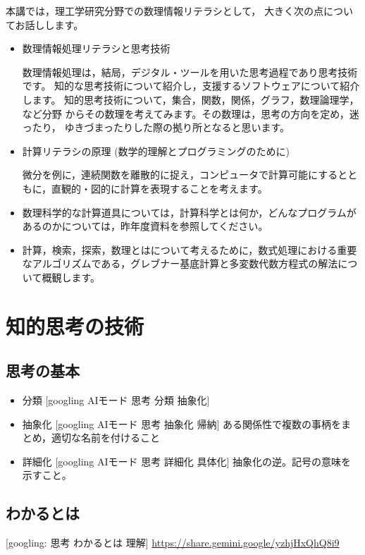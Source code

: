 \documentclass[dvipdfmx,11pat]{jarticle}
\begin{document}
本講では，理工学研究分野での数理情報リテラシとして，
大きく次の点についてお話しします。

\begin{itemize}
\item 数理情報処理リテラシと思考技術

数理情報処理は，結局，デジタル・ツールを用いた思考過程であり思考技術です。
知的な思考技術について紹介し，支援するソフトウェアについて紹介します。
知的思考技術について，集合，関数，関係，グラフ，数理論理学，など分野
からその数理を考えてみます。その数理は，思考の方向を定め，迷ったり，
ゆきづまったりした際の拠り所となると思います。

\item 計算リテラシの原理 (数学的理解とプログラミングのために)

微分を例に，連続関数を離散的に捉え，コンピュータで計算可能にするとと
もに，直観的・図的に計算を表現することを考えます。

\item 数理科学的な計算道具については，計算科学とは何か，どんなプログラムが
あるのかについては，昨年度資料を参照してください。

\item 計算，検索，探索，数理とはについて考えるために，数式処理における重要
なアルゴリズムである，グレブナー基底計算と多変数代数方程式の解法につ
いて概観します。
\end{itemize}
\section{知的思考の技術}
\label{sec:org2eaded2}
\subsection{思考の基本}
\label{sec:org4965828}
\begin{itemize}
\item 分類 [googling AIモード 思考 分類 抽象化]

\item 抽象化 [googling AIモード 思考 抽象化 帰納]
ある関係性で複数の事柄をまとめ，適切な名前を付けること

\item 詳細化 [googling AIモード 思考 詳細化  具体化]
抽象化の逆。記号の意味を示すこと。
\end{itemize}
\subsection{わかるとは}
\label{sec:org623698c}
{[}googling: 思考 わかるとは 理解] \url{https://share.gemini.google/yzhjHxQhQ8i9}
\end{document}
